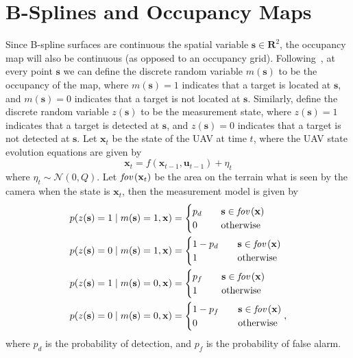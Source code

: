 \documentclass{article}
\newcommand{\fov}[1]{\text{\em fov}\left(#1\right)}
\newcommand{\sbf}{\mathbf{s}}
\newcommand{\ubf}{\mathbf{u}}
\newcommand{\xbf}{\mathbf{x}}
\begin{document}
\section{B-Splines and Occupancy Maps}

Since B-spline surfaces are continuous the spatial variable $\sbf\in\mathbf{R}^2$, the occupancy map will also be continuous (as opposed to an occupancy grid).  Following~\cite{RodriguesTsiogkasAguiar20}, at every point $\sbf$ we can define the discrete random variable $m(\sbf)$ to be the occupancy of the map, where $m(\sbf)=1$ indicates that a target is located at $\sbf$, and $m(\sbf)=0$ indicates that a target is not located at $\sbf$.  
%
Similarly, define the discrete random variable $z(\sbf)$ to be the measurement state, where $z(\sbf)=1$ indicates that a target is detected at $\sbf$, and $z(\sbf)=0$ indicates that a target is not detected at $\sbf$.
% 
Let $\xbf_t$ be the state of the UAV at time $t$, where the UAV state evolution equations are given by
\[
\xbf_t = f(\xbf_{t-1}, \ubf_{t-1}) + \eta_t
\]
where $\eta_t\sim\mathcal{N}(0, Q)$. Let $\fov{\xbf_t}$ be the area on the terrain what is seen by the camera when the state is $\xbf_t$, then the measurement model is given by
%
\begin{align}
	p(z(\sbf)=1 \mid m(\sbf)=1, \xbf) &= \begin{cases}
 											p_d &\quad \mathbf{s}\in\fov{\xbf} \\
 											0 &\quad \text{otherwise}
 										 \end{cases} 
	\label{eq:prob_z=1:m=1}\\
	p(z(\sbf)=0 \mid m(\sbf)=1, \xbf) &= \begin{cases}
 											1-p_d &\quad \mathbf{s}\in\fov{\xbf} \\
 											1 &\quad \text{otherwise}
 										 \end{cases}
	\label{eq:prob_z=0:m=1}\\
	p(z(\sbf)=1 \mid m(\sbf)=0, \xbf) &= \begin{cases}
 											p_f &\quad \mathbf{s}\in\fov{\xbf} \\
 											1 &\quad \text{otherwise}
 										  \end{cases}
	\label{eq:prob_z=1:m=0}\\
	p(z(\sbf)=0 \mid m(\sbf)=0, \xbf) &= \begin{cases}
 											1-p_f &\quad \mathbf{s}\in\fov{\xbf} \\
 											0 &\quad \text{otherwise}
 										  \end{cases},
 	\label{eq:prob_z=1:m=0}
\end{align}
where $p_d$ is the probability of detection, and $p_f$ is the probability of false alarm.
\end{document}
